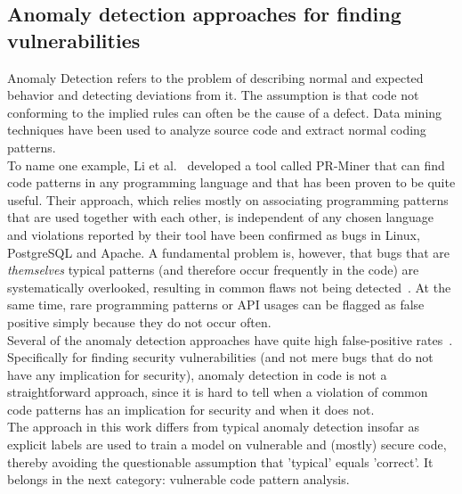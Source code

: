 \documentclass[
a4paper,
pagesize,
pdftex,
12pt,
ngerman,
fleqn,
final,
]{scrartcl}
\begin{document}
	\subsection{Anomaly detection approaches for finding vulnerabilities}
	Anomaly Detection refers to the problem of describing normal and expected behavior and detecting deviations from it. The assumption is that code not conforming to the implied rules can often be the cause of a defect. Data mining techniques have been used to analyze source code and extract normal coding patterns.\\
	To name one example, Li et al.~\cite{Li.2005} developed a tool called PR-Miner that can find code patterns in any programming language and that has been proven to be quite useful. Their approach, which relies mostly on associating programming patterns that are used together with each other, is independent of any chosen language and violations reported by their tool have been confirmed as bugs in Linux, PostgreSQL and Apache. A fundamental problem is, however, that bugs that are \textit{themselves} typical patterns (and therefore occur frequently in the code) are systematically overlooked, resulting in common flaws not being detected~\cite{Yamaguchi.2012}. At the same time, rare programming patterns or API usages can be flagged as false positive simply because they do not occur often.\\
	Several of the anomaly detection approaches have quite high false-positive rates~\cite{Ghaffarian.2017}. Specifically for finding security vulnerabilities (and not mere bugs that do not have any implication for security), anomaly detection in code is not a straightforward approach, since it is hard to tell when a violation of common code patterns has an implication for security and when it does not.\\
	The approach in this work differs from typical anomaly detection insofar as explicit labels are used to train a model on vulnerable and (mostly) secure code, thereby avoiding the questionable assumption that 'typical' equals 'correct'. It belongs in the next category: vulnerable code pattern analysis. 
	
\end{document}
